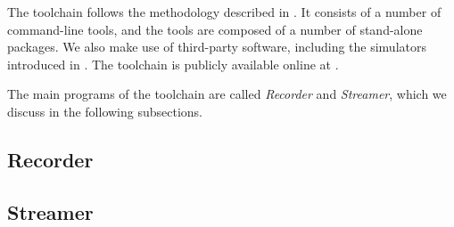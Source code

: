 The toolchain follows the methodology described in . It
consists of a number of command-line tools, and the tools are composed of a
number of stand-alone packages. We also make use of third-party software,
including the simulators introduced in . The toolchain is
publicly available online at \cite{sources}.

The main programs of the toolchain are called \emph{Recorder} and
\emph{Streamer}, which we discuss in the following subsections.

\subsection{Recorder} 


\subsection{Streamer} 

